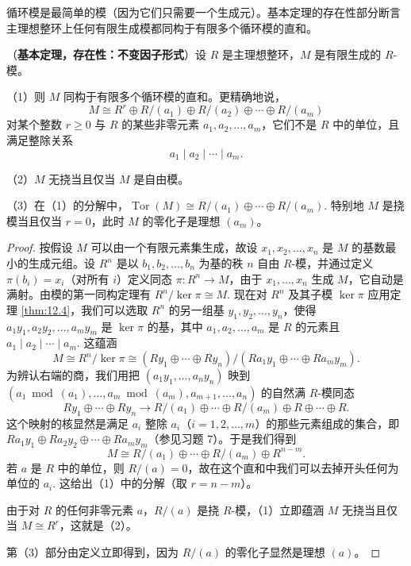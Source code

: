 循环模是最简单的模（因为它们只需要一个生成元）。基本定理的存在性部分断言主理想整环上任何有限生成模都同构于有限多个循环模的直和。

\begin{theorem}\label{thm:12.5}
（\textbf{基本定理，存在性：不变因子形式}）设 \(R\) 是主理想整环，\(M\) 是有限生成的 \(R\)-模。

（1）则 \(M\) 同构于有限多个循环模的直和。更精确地说，
\[
M \cong R^r \oplus R/(a_1) \oplus R/(a_2) \oplus \cdots \oplus R/(a_m)
\]
对某个整数 \(r \geq 0\) 与 \(R\) 的某些非零元素 \(a_1, a_2, \ldots, a_m\)，它们不是 \(R\) 中的单位，且满足整除关系
\[
a_1 \mid a_2 \mid \cdots \mid a_m.
\]

（2）\(M\) 无挠当且仅当 \(M\) 是自由模。

（3）在（1）的分解中，\(\operatorname{Tor}(M) \cong R/(a_1) \oplus \cdots \oplus R/(a_m)\). 特别地 \(M\) 是挠模当且仅当 \(r = 0\)，此时 \(M\) 的零化子是理想 \((a_m)\)。
\end{theorem}

\begin{proof}
按假设 \(M\) 可以由一个有限元素集生成，故设 \(x_1, x_2, \ldots, x_n\) 是 \(M\) 的基数最小的生成元组。设 \(R^n\) 是以 \(b_1, b_2, \ldots, b_n\) 为基的秩 \(n\) 自由 \(R\)-模，并通过定义 \(\pi(b_i) = x_i\)（对所有 \(i\)）定义同态 \(\pi : R^n \to M\)，由于 \(x_1, \ldots, x_n\) 生成 \(M\)，它自动是满射。由模的第一同构定理有 \(R^n/\ker\pi \cong M\). 现在对 \(R^n\) 及其子模 \(\ker\pi\) 应用定理 \ref{thm:12.4}，我们可以选取 \(R^n\) 的另一组基 \(y_1, y_2, \ldots, y_n\)，使得 \(a_1y_1, a_2y_2, \ldots, a_my_m\) 是 \(\ker\pi\) 的基，其中 \(a_1, a_2, \ldots, a_m\) 是 \(R\) 的元素且 \(a_1 \mid a_2 \mid \cdots \mid a_m\). 这蕴涵
\[
M \cong R^n/\ker\pi \cong (Ry_1 \oplus \cdots \oplus Ry_n)/(Ra_1y_1 \oplus \cdots \oplus Ra_my_m).
\]
为辨认右端的商，我们用把 \((a_1y_1, \ldots, a_ny_n)\) 映到 \((a_1 \bmod (a_1), \ldots, a_m \bmod (a_m), a_{m+1}, \ldots, a_n)\) 的自然满 \(R\)-模同态
\[
Ry_1 \oplus \cdots \oplus Ry_n \longrightarrow R/(a_1) \oplus \cdots \oplus R/(a_m) \oplus R \oplus \cdots \oplus R.
\]
这个映射的核显然是满足 \(a_i\) 整除 \(a_i\)（\(i = 1, 2, \ldots, m\)）的那些元素组成的集合，即 \(Ra_1y_1 \oplus Ra_2y_2 \oplus \cdots \oplus Ra_my_m\)（参见习题 7）。于是我们得到
\[
M \cong R/(a_1) \oplus \cdots \oplus R/(a_m) \oplus R^{n-m}.
\]
若 \(a\) 是 \(R\) 中的单位，则 \(R/(a) = 0\)，故在这个直和中我们可以去掉开头任何为单位的 \(a_i\). 这给出（1）中的分解（取 \(r = n-m\)）。

由于对 \(R\) 的任何非零元素 \(a\)，\(R/(a)\) 是挠 \(R\)-模，（1）立即蕴涵 \(M\) 无挠当且仅当 \(M \cong R^r\)，这就是（2）。

第（3）部分由定义立即得到，因为 \(R/(a)\) 的零化子显然是理想 \((a)\)。
\end{proof}

